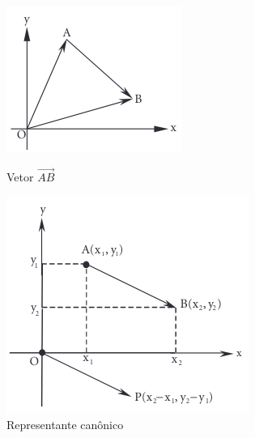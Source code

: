 \begin{figure}[h]
  \centering
  \begin{minipage}{0.45\textwidth}
    \centering
    \includegraphics[width=\linewidth]{./fig/fig1.44.png}
    \caption{Vetor $\overrightarrow{AB}$}\label{fig:fig1.44}
  \end{minipage}
  \hfill
  \begin{minipage}{0.45\textwidth}
    \centering
    \includegraphics[width=\linewidth]{./fig/fig1.45.png}
    \caption{Representante canônico}\label{fig:fig1.45}
  \end{minipage}
\end{figure}

